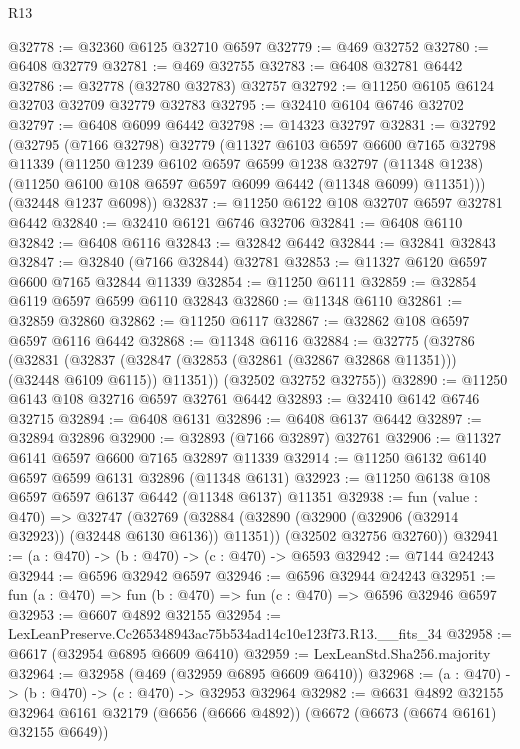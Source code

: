 \begin{lexlean}{R13}
\begin{coremodule}
@32778 := @32360 @6125 @32710 @6597
@32779 := @469 @32752
@32780 := @6408 @32779
@32781 := @469 @32755
@32783 := @6408 @32781 @6442
@32786 := @32778 (@32780 @32783) @32757
@32792 := @11250 @6105 @6124 @32703 @32709 @32779 @32783
@32795 := @32410 @6104 @6746 @32702
@32797 := @6408 @6099 @6442
@32798 := @14323 @32797
@32831 := @32792
    (@32795
      (@7166 @32798)
      @32779
      (@11327
        @6103
        @6597
        @6600
        @7165
        @32798
        @11339
        (@11250
          @1239
          @6102
          @6597
          @6599
          @1238
          @32797
          (@11348 @1238)
          (@11250 @6100 @108 @6597 @6597 @6099 @6442 (@11348 @6099) @11351)))
      (@32448 @1237 @6098))
@32837 := @11250 @6122 @108 @32707 @6597 @32781 @6442
@32840 := @32410 @6121 @6746 @32706
@32841 := @6408 @6110
@32842 := @6408 @6116
@32843 := @32842 @6442
@32844 := @32841 @32843
@32847 := @32840 (@7166 @32844) @32781
@32853 := @11327 @6120 @6597 @6600 @7165 @32844 @11339
@32854 := @11250 @6111
@32859 := @32854 @6119 @6597 @6599 @6110 @32843
@32860 := @11348 @6110
@32861 := @32859 @32860
@32862 := @11250 @6117
@32867 := @32862 @108 @6597 @6597 @6116 @6442
@32868 := @11348 @6116
@32884 := @32775
    (@32786
      (@32831
        (@32837 (@32847 (@32853 (@32861 (@32867 @32868 @11351))) (@32448 @6109 @6115)) @11351))
      (@32502 @32752 @32755))
@32890 := @11250 @6143 @108 @32716 @6597 @32761 @6442
@32893 := @32410 @6142 @6746 @32715
@32894 := @6408 @6131
@32896 := @6408 @6137 @6442
@32897 := @32894 @32896
@32900 := @32893 (@7166 @32897) @32761
@32906 := @11327 @6141 @6597 @6600 @7165 @32897 @11339
@32914 := @11250 @6132 @6140 @6597 @6599 @6131 @32896 (@11348 @6131)
@32923 := @11250 @6138 @108 @6597 @6597 @6137 @6442 (@11348 @6137) @11351
@32938 := fun (value : @470) =>
  @32747
    (@32769
      (@32884 (@32890 (@32900 (@32906 (@32914 @32923)) (@32448 @6130 @6136)) @11351))
      (@32502 @32756 @32760))
@32941 := (a : @470) -> (b : @470) -> (c : @470) -> @6593
@32942 := @7144 @24243
@32944 := @6596 @32942 @6597
@32946 := @6596 @32944 @24243
@32951 := fun (a : @470) => fun (b : @470) => fun (c : @470) => @6596 @32946 @6597
@32953 := @6607 @4892 @32155
@32954 := LexLeanPreserve.Cc265348943ac75b534ad14c10e123f73.R13.__fits_34
@32958 := @6617 (@32954 @6895 @6609 @6410)
@32959 := LexLeanStd.Sha256.majority
@32964 := @32958 (@469 (@32959 @6895 @6609 @6410))
@32968 := (a : @470) -> (b : @470) -> (c : @470) -> @32953 @32964
@32982 := @6631
    @4892
    @32155
    @32964
    @6161
    @32179
    (@6656 (@6666 @4892))
    (@6672 (@6673 (@6674 @6161) @32155 @6649))

\end{coremodule}
\end{lexlean}
